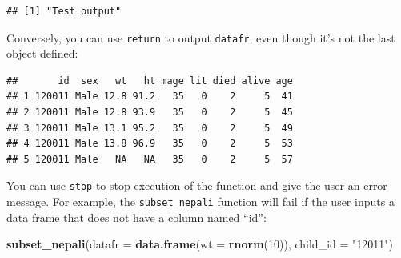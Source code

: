 \documentclass[]{book}
\makeatletter
\newenvironment{Shaded}{\begin{snugshade}}{\end{snugshade}}
\newcommand{\KeywordTok}[1]{\textcolor[rgb]{0.13,0.29,0.53}{\textbf{#1}}}
\newcommand{\DataTypeTok}[1]{\textcolor[rgb]{0.13,0.29,0.53}{#1}}
\newcommand{\DecValTok}[1]{\textcolor[rgb]{0.00,0.00,0.81}{#1}}
\newcommand{\StringTok}[1]{\textcolor[rgb]{0.31,0.60,0.02}{#1}}
\newcommand{\ControlFlowTok}[1]{\textcolor[rgb]{0.13,0.29,0.53}{\textbf{#1}}}
\newcommand{\OperatorTok}[1]{\textcolor[rgb]{0.81,0.36,0.00}{\textbf{#1}}}
\newcommand{\NormalTok}[1]{#1}
\newenvironment{kframe}{%
\medskip{}
\setlength{\fboxsep}{.8em}
 \def\at@end@of@kframe{}%
 \ifinner\ifhmode%
  \def\at@end@of@kframe{\end{minipage}}%
  \begin{minipage}{\columnwidth}%
 \fi\fi%
 \def\FrameCommand##1{\hskip\@totalleftmargin \hskip-\fboxsep
 \colorbox{shadecolor}{##1}\hskip-\fboxsep
     \hskip-\linewidth \hskip-\@totalleftmargin \hskip\columnwidth}%
 \MakeFramed {\advance\hsize-\width
   \@totalleftmargin\z@ \linewidth\hsize
   \@setminipage}}%
 {\par\unskip\endMakeFramed%
 \at@end@of@kframe}
\renewenvironment{Shaded}{\begin{kframe}}{\end{kframe}}
\theoremstyle{definition}
\theoremstyle{definition}
\theoremstyle{definition}
\theoremstyle{remark}
\makeatother
\begin{document}
\begin{Shaded}
\end{Shaded}

\begin{verbatim}
## [1] "Test output"
\end{verbatim}

Conversely, you can use \texttt{return} to output \texttt{datafr}, even
though it's not the last object defined:

\begin{Shaded}
\end{Shaded}

\begin{verbatim}
##       id  sex   wt   ht mage lit died alive age
## 1 120011 Male 12.8 91.2   35   0    2     5  41
## 2 120011 Male 12.8 93.9   35   0    2     5  45
## 3 120011 Male 13.1 95.2   35   0    2     5  49
## 4 120011 Male 13.8 96.9   35   0    2     5  53
## 5 120011 Male   NA   NA   35   0    2     5  57
\end{verbatim}

You can use \texttt{stop} to stop execution of the function and give the
user an error message. For example, the \texttt{subset\_nepali} function
will fail if the user inputs a data frame that does not have a column
named ``id'':

\begin{Shaded}
\begin{Highlighting}[]
\KeywordTok{subset_nepali}\NormalTok{(}\DataTypeTok{datafr =} \KeywordTok{data.frame}\NormalTok{(}\DataTypeTok{wt =} \KeywordTok{rnorm}\NormalTok{(}\DecValTok{10}\NormalTok{)),}
              \DataTypeTok{child_id =} \StringTok{"12011"}\NormalTok{)}
\end{Highlighting}
\end{Shaded}
\end{document}
